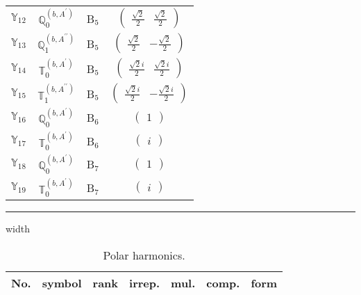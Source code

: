 \documentclass[fleqn,10pt,landscape]{article}
\begin{document}
\begin{itemize}
\begin{center}
\begin{longtable}{c|c|c|c}
$ \mathbb{Y}_{12} $ & $\mathbb{Q}_{0}^{(b,A^{\prime})}$ & B$_{5}$ & $\begin{pmatrix} \frac{\sqrt{2}}{2} & \frac{\sqrt{2}}{2} \end{pmatrix}$ \\
$ \mathbb{Y}_{13} $ & $\mathbb{Q}_{1}^{(b,A^{\prime\prime})}$ & B$_{5}$ & $\begin{pmatrix} \frac{\sqrt{2}}{2} & - \frac{\sqrt{2}}{2} \end{pmatrix}$ \\
$ \mathbb{Y}_{14} $ & $\mathbb{T}_{0}^{(b,A^{\prime})}$ & B$_{5}$ & $\begin{pmatrix} \frac{\sqrt{2} i}{2} & \frac{\sqrt{2} i}{2} \end{pmatrix}$ \\
$ \mathbb{Y}_{15} $ & $\mathbb{T}_{1}^{(b,A^{\prime\prime})}$ & B$_{5}$ & $\begin{pmatrix} \frac{\sqrt{2} i}{2} & - \frac{\sqrt{2} i}{2} \end{pmatrix}$ \\ \hline
$ \mathbb{Y}_{16} $ & $\mathbb{Q}_{0}^{(b,A^{\prime})}$ & B$_{6}$ & $\begin{pmatrix} 1 \end{pmatrix}$ \\
$ \mathbb{Y}_{17} $ & $\mathbb{T}_{0}^{(b,A^{\prime})}$ & B$_{6}$ & $\begin{pmatrix} i \end{pmatrix}$ \\ \hline
$ \mathbb{Y}_{18} $ & $\mathbb{Q}_{0}^{(b,A^{\prime})}$ & B$_{7}$ & $\begin{pmatrix} 1 \end{pmatrix}$ \\
$ \mathbb{Y}_{19} $ & $\mathbb{T}_{0}^{(b,A^{\prime})}$ & B$_{7}$ & $\begin{pmatrix} i \end{pmatrix}$ \\
\end{longtable}
\end{center}

 \hfil \hrule height 1mm width \textwidth \hfil

\begin{center}
\renewcommand{\arraystretch}{1.3}
\begin{longtable}{ccccccc}
\caption{Polar harmonics.}
 \\
 \hline \hline
No. & symbol & rank & irrep. & mul. & comp. & form \\ \hline \endfirsthead


\end{longtable}
\end{center}
\end{itemize}
\end{document}
